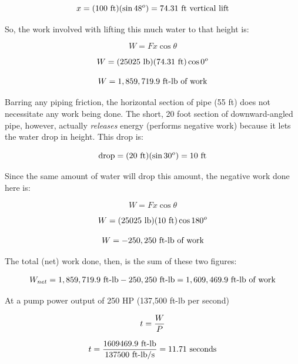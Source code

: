 $$x = (100 \hbox{ ft})(\sin 48^o) = 74.31 \hbox{ ft vertical lift}$$

So, the work involved with lifting this much water to that height is:

$$W = F x \cos \theta$$

$$W = (25025 \hbox{ lb}) (74.31 \hbox{ ft}) \cos 0^o$$

$$W = 1,859,719.9 \hbox{ ft-lb of work}$$

Barring any piping friction, the horizontal section of pipe (55 ft) does not necessitate any work being done.  The short, 20 foot section of downward-angled pipe, however, actually {\it releases} energy (performs negative work) because it lets the water drop in height.  This drop is:

$$\hbox{drop} = (20 \hbox{ ft})(\sin 30^o) = 10 \hbox{ ft}$$

Since the same amount of water will drop this amount, the negative work done here is:

$$W = F x \cos \theta$$

$$W = (25025 \hbox{ lb}) (10 \hbox{ ft}) \cos 180^o$$

$$W = -250,250 \hbox{ ft-lb of work}$$

The total (net) work done, then, is the sum of these two figures:

$$W_{net} = 1,859,719.9 \hbox{ ft-lb} - 250,250 \hbox{ ft-lb} = 1,609,469.9 \hbox{ ft-lb of work}$$

\vskip 10pt

At a pump power output of 250 HP (137,500 ft-lb per second)

$$t = {W \over P}$$

$$t = {1609469.9 \hbox{ ft-lb} \over 137500 \hbox{ ft-lb/s}} = 11.71 \hbox{ seconds}$$











